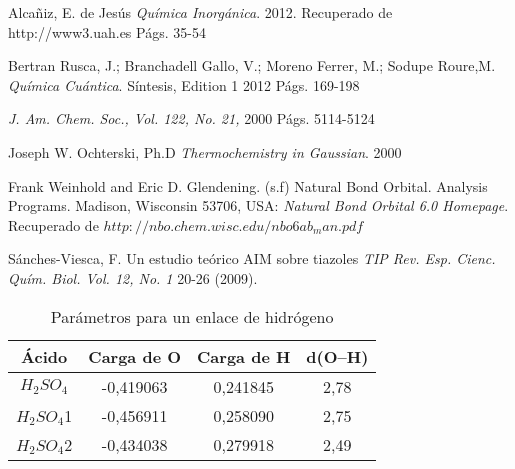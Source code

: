 \begin{thebibliography}{9}
Alcañiz, E. de Jesús  
\textit{Química Inorgánica}. 
2012. 
Recuperado de http://www3.uah.es Págs. 35-54

Bertran Rusca, J.; Branchadell Gallo, V.; Moreno Ferrer, M.; Sodupe Roure,M.  
\textit{Química Cuántica}. Síntesis, Edition 1
2012 Págs. 169-198

\textit{J. Am. Chem. Soc., Vol. 122, No. 21, }
2000 Págs. 5114-5124

Joseph W. Ochterski, Ph.D
\textit{Thermochemistry in Gaussian}.
2000

Frank Weinhold and Eric D. Glendening. (s.f) Natural Bond Orbital. Analysis Programs. Madison, Wisconsin 53706, USA: 
\textit {Natural Bond Orbital 6.0 Homepage}. Recuperado de $http://nbo.chem.wisc.edu/nbo6ab_man.pdf$

Sánches-Viesca, F. Un estudio teórico AIM sobre tiazoles \textit{TIP Rev. Esp. Cienc. Quím. Biol. Vol. 12, No. 1} 20-26 (2009).
\end{thebibliography}

\begin{table}[H]
	\centering
	\begin{tabular}{|c|c|c|c|}
		\hline
		Ácido & Carga de O & Carga de H & d(O--H) \\ \hline
		$H_2SO_4$ & -0,419063 & 0,241845 & 2,78 \\ \hline
		$H_2SO_4$1 & -0,456911 & 0,258090 & 2,75 \\ \hline
		$H_2SO_4$2 & -0,434038 & 0,279918 & 2,49 \\ \hline
	\end{tabular}
	\caption{Parámetros para un enlace de hidrógeno}
\end{table}